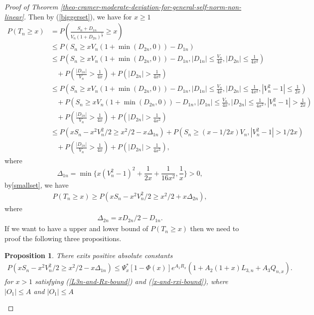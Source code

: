 \documentclass[bj,authoryear]{imsart}
\numberwithin{equation}{section}
\theoremstyle{plain}
\newtheorem{prop}{Proposition}[section]
\theoremstyle{definition}
\begin{document}
\begin{proof}[Proof of Theorem \ref{theo-cramer-moderate-deviation-for-general-self-norm-non-linear}]
Then by (\ref{biggerset}), we have for $x\geq 1$
\begin{equation}
  \begin{aligned}
    P(T_n\geq x)& = P(\frac{S_n+D_{1n}}{V_n(1+D_{2n})^{\frac{1}{2}}}\geq x)\\
    &\leq P(S_n\geq xV_n(1+\min(D_{2n},0))-D_{1n})\\
    &\leq P(S_n\geq xV_n(1+\min(D_{2n},0))-D_{1n},|D_{1n}|\leq \frac{V_n}{4x},|D_{2n}|\leq \frac{1}{4x^2})\\
    &\ \ \ \ +P(\frac{|D_{1n}|}{V_n}> \frac{1}{4x})+P(|D_{2n}|>\frac{1}{4x^2})\\
    &\leq P(S_n\geq xV_n(1+\min(D_{2n},0))-D_{1n},|D_{1n}|\leq \frac{V_n}{4x},|D_{2n}|\leq \frac{1}{4x^2},|V_{n}^{2}-1|\leq \frac{1}{2x})\\
    &\ \ \ \ +P(S_n\geq xV_n(1+\min(D_{2n},0))-D_{1n},|D_{1n}|\leq \frac{V_n}{4x},|D_{2n}|\leq \frac{1}{4x^2},|V_{n}^{2}-1|> \frac{1}{2x})\\
    &\ \ \ \ +P(\frac{|D_{1n}|}{V_n}> \frac{1}{4x})+P(|D_{2n}|>\frac{1}{4x^2})\\
    &\leq P(xS_n-x^2V_{n}^{2}/2\geq x^2/2-x\Delta_{1n})+P(S_n\geq (x-1/2x)V_n,|V_{n}^{2}-1|>1/2x)\\
    &\ \ \ \ +P(\frac{|D_{1n}|}{V_n}> \frac{1}{4x})+P(|D_{2n}|>\frac{1}{4x^2}),
  \end{aligned}
\end{equation}
where
\begin{equation}
  \Delta_{1n} = \min\{x(V_{n}^{2}-1)^2+\frac{1}{2x}+\frac{1}{16x^2},\frac{1}{x}\}>0,
\end{equation}
by\eqref{smallset}, we have
\begin{align}
  P(T_n\geq x )\geq P(xS_n-x^2V_{n}^{2}/2\geq x^2/2+x\Delta_{2n}),
\end{align}
where
\begin{align}
  \Delta_{2n} = xD_{2n}/2-D_{1n}.
\end{align}
If we want to have a upper and lower bound of $P(T_n\geq x)$ then we need to proof the following three propositions.

\begin{prop}\label{proposition A1}
There exits positive absolute constants  
\begin{align}
  P(xS_n-x^2V_{n}^{2}/2\geq x^2/2-x\Delta_{1n}) \leq  \Psi_{x}^{*}[1-\Phi(x)]e^{A_1R_x}(1+A_2(1+x)L_{3,n}+A_3Q_{n,x}).
\end{align} 
for $x>1$ satisfying (\ref{L3n-and-Rx-bound}) and (\ref{x-and-rxi-bound}), where $|O_1| \leq A$ and $|O_{1}|\leq A$
\end{prop}


\end{proof}
\end{document}
